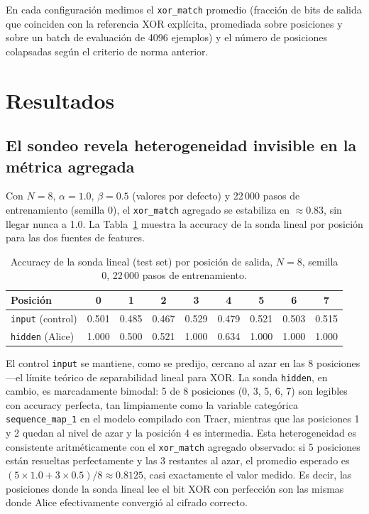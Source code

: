 \documentclass[manuscript,screen]{acmart}
\begin{document}
En cada configuración medimos el \texttt{xor\_match} promedio (fracción de bits de salida que
coinciden con la referencia XOR explícita, promediada sobre posiciones y sobre un batch de
evaluación de 4096 ejemplos) y el número de posiciones colapsadas según el criterio de norma
anterior.

\section{Resultados}
\label{sec:resultados}

\subsection{El sondeo revela heterogeneidad invisible en la métrica agregada}

Con $N=8$, $\alpha=1.0$, $\beta=0.5$ (valores por defecto) y 22\,000 pasos de entrenamiento
(semilla 0), el \texttt{xor\_match} agregado se estabiliza en $\approx 0.83$, sin llegar nunca
a 1.0. La Tabla~\ref{tab:probe} muestra la accuracy de la sonda lineal por posición para las
dos fuentes de features.

\begin{table}[h]
  \caption{Accuracy de la sonda lineal (test set) por posición de salida, $N=8$, semilla 0,
    22\,000 pasos de entrenamiento.}
  \label{tab:probe}
  \begin{tabular}{lcccccccc}
    \toprule
    Posición & 0 & 1 & 2 & 3 & 4 & 5 & 6 & 7 \\
    \midrule
    \texttt{input} (control) & 0.501 & 0.485 & 0.467 & 0.529 & 0.479 & 0.521 & 0.503 & 0.515 \\
    \texttt{hidden} (Alice)  & 1.000 & 0.500 & 0.521 & 1.000 & 0.634 & 1.000 & 1.000 & 1.000 \\
    \bottomrule
  \end{tabular}
\end{table}

El control \texttt{input} se mantiene, como se predijo, cercano al azar en las 8 posiciones —el
límite teórico de separabilidad lineal para XOR. La sonda \texttt{hidden}, en cambio, es
marcadamente bimodal: 5 de 8 posiciones (0, 3, 5, 6, 7) son legibles con accuracy perfecta,
tan limpiamente como la variable categórica \texttt{sequence\_map\_1} en el modelo compilado con
Tracr, mientras que las posiciones 1 y 2 quedan al nivel de azar y la posición 4 es intermedia.
Esta heterogeneidad es consistente aritméticamente con el \texttt{xor\_match} agregado
observado: si 5 posiciones están resueltas perfectamente y las 3 restantes al azar, el promedio
esperado es $(5 \times 1.0 + 3 \times 0.5)/8 \approx 0.8125$, casi exactamente el valor medido.
Es decir, las posiciones donde la sonda lineal lee el bit XOR con perfección son las mismas
donde Alice efectivamente convergió al cifrado correcto.
\end{document}
